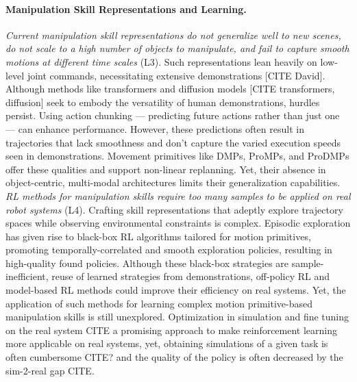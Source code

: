 \begin{refsection}
\paragraph{Manipulation Skill Representations and Learning.} 
\textit{Current manipulation skill representations do not generalize well to new scenes, do not scale to a high number of objects to manipulate, and fail to capture smooth motions at different time scales} (L3). Such representations lean heavily on low-level joint commands, necessitating extensive demonstrations [CITE David]. Although methods like transformers and diffusion models [CITE transformers, diffusion] seek to embody the versatility of human demonstrations, hurdles persist. Using action chunking — predicting future actions rather than just one — can enhance performance. However, these predictions often result in trajectories that lack smoothness and don't capture the varied execution speeds seen in demonstrations. Movement primitives like DMPs, ProMPs, and ProDMPs offer these qualities and support non-linear replanning. Yet, their absence in object-centric, multi-modal architectures limits their generalization capabilities. 
\textit{RL methods for manipulation skills require too many samples to be applied on real robot systems} (L4). Crafting skill representations that adeptly explore trajectory spaces while observing environmental constraints is complex. Episodic exploration has given rise to black-box RL algorithms tailored for motion primitives, promoting temporally-correlated and smooth exploration policies, resulting in high-quality found policies. Although these black-box strategies are sample-inefficient, reuse of learned strategies from demonstrations, off-policy RL and model-based RL methods could improve their efficiency on real systems. Yet, the application of such methods for learning complex motion primitive-based manipulation skills is still unexplored. Optimization in simulation and fine tuning on the real system CITE a promising approach to make reinforcement learning more applicable on real systems, yet, obtaining simulations of a given task is often cumbersome CITE? and the quality of the policy is often decreased by the sim-2-real gap CITE.
\vspace{-0.3cm}

\end{refsection}
